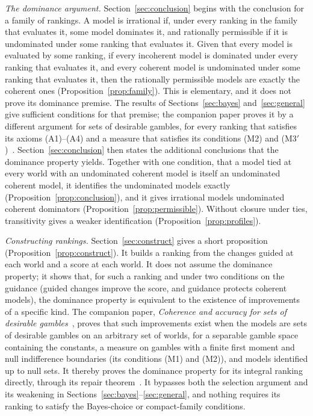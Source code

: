 \documentclass[11pt]{article}
\theoremstyle{definition}
\theoremstyle{remark}
\begin{document}
\emph{The dominance argument.} Section~\ref{sec:conclusion} begins with the conclusion for a family of rankings. A model is irrational if, under every ranking in the family that evaluates it, some model dominates it, and rationally permissible if it is undominated under some ranking that evaluates it. Given that every model is evaluated by some ranking, if every incoherent model is dominated under every ranking that evaluates it, and every coherent model is undominated under some ranking that evaluates it, then the rationally permissible models are exactly the coherent ones (Proposition~\ref{prop:family}). This is elementary, and it does not prove its dominance premise. The results of Sections~\ref{sec:bayes} and~\ref{sec:general} give sufficient conditions for that premise; the companion paper proves it by a different argument for sets of desirable gambles, for every ranking that satisfies its axioms (A1)--(A4) and a measure that satisfies its conditions (M2) and (M3$'$)~\cite[Theorem~4.1]{KCM}. Section~\ref{sec:conclusion} then states the additional conclusions that the dominance property yields. Together with one condition, that a model tied at every world with an undominated coherent model is itself an undominated coherent model, it identifies the undominated models exactly (Proposition~\ref{prop:conclusion}), and it gives irrational models undominated coherent dominators (Proposition~\ref{prop:permissible}). Without closure under ties, transitivity gives a weaker identification (Proposition~\ref{prop:profiles}).

\emph{Constructing rankings.} Section~\ref{sec:construct} gives a short proposition (Proposition~\ref{prop:construct}). It builds a ranking from the changes guided at each world and a score at each world. It does not assume the dominance property; it shows that, for such a ranking and under two conditions on the guidance (guided changes improve the score, and guidance protects coherent models), the dominance property is equivalent to the existence of improvements of a specific kind. The companion paper, \emph{Coherence and accuracy for sets of desirable gambles}~\cite{KCM}, proves that such improvements exist when the models are sets of desirable gambles on an arbitrary set of worlds, for a separable gamble space containing the constants, a measure on gambles with a finite first moment and null indifference boundaries (its conditions (M1) and (M2)), and models identified up to null sets. It thereby proves the dominance property for its integral ranking directly, through its repair theorem~\cite[Theorem~6.8 and Corollary~6.9]{KCM}. It bypasses both the selection argument and its weakening in Sections~\ref{sec:bayes}--\ref{sec:general}, and nothing requires its ranking to satisfy the Bayes-choice or compact-family conditions.
\end{document}
